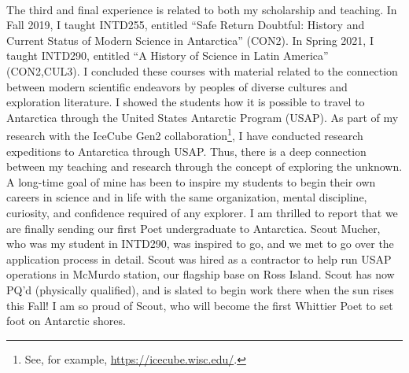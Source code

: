 \documentclass[../../main.tex]{subfiles}
\begin{document}
\\
\vspace{0.25cm}
The third and final experience is related to both my scholarship and teaching.  In Fall 2019, I taught INTD255, entitled ``Safe Return Doubtful: History and Current Status of Modern Science in Antarctica'' (CON2).  In Spring 2021, I taught INTD290, entitled ``A History of Science in Latin America'' (CON2,CUL3).  I concluded these courses with material related to the connection between modern scientific endeavors by peoples of diverse cultures and exploration literature.  I showed the students how it is possible to travel to Antarctica through the United States Antarctic Program (USAP).  As part of my research with the IceCube Gen2 collaboration\footnote{See, for example, \url{https://icecube.wisc.edu/}.}, I have conducted research expeditions to Antarctica through USAP.  Thus, there is a deep connection between my teaching and research through the concept of exploring the unknown.  A long-time goal of mine has been to inspire my students to begin their own careers in science and in life with the same organization, mental discipline, curiosity, and confidence required of any explorer.  I am thrilled to report that we are finally sending our first Poet undergraduate to Antarctica.  Scout Mucher, who was my student in INTD290, was inspired to go, and we met to go over the application process in detail.  Scout was hired as a contractor to help run USAP operations in McMurdo station, our flagship base on Ross Island.  Scout has now PQ'd (physically qualified), and is slated to begin work there when the sun rises this Fall!  I am so proud of Scout, who will become the first Whittier Poet to set foot on Antarctic shores.
\\
\vspace{0.25cm}
\end{document}
